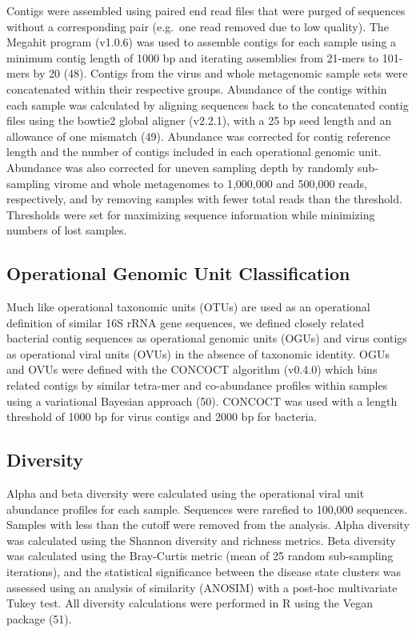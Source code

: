 \documentclass[12pt,]{article}
\begin{document}
Contigs were assembled using paired end read files that were purged of
sequences without a corresponding pair (e.g.~one read removed due to low
quality). The Megahit program (v1.0.6) was used to assemble contigs for
each sample using a minimum contig length of 1000 bp and iterating
assemblies from 21-mers to 101-mers by 20 (48). Contigs from the virus
and whole metagenomic sample sets were concatenated within their
respective groups. Abundance of the contigs within each sample was
calculated by aligning sequences back to the concatenated contig files
using the bowtie2 global aligner (v2.2.1), with a 25 bp seed length and
an allowance of one mismatch (49). Abundance was corrected for contig
reference length and the number of contigs included in each operational
genomic unit. Abundance was also corrected for uneven sampling depth by
randomly sub-sampling virome and whole metagenomes to 1,000,000 and
500,000 reads, respectively, and by removing samples with fewer total
reads than the threshold. Thresholds were set for maximizing sequence
information while minimizing numbers of lost samples.

\subsection{Operational Genomic Unit
Classification}\label{operational-genomic-unit-classification}

Much like operational taxonomic units (OTUs) are used as an operational
definition of similar 16S rRNA gene sequences, we defined closely
related bacterial contig sequences as operational genomic units (OGUs)
and virus contigs as operational viral units (OVUs) in the absence of
taxonomic identity. OGUs and OVUs were defined with the CONCOCT
algorithm (v0.4.0) which bins related contigs by similar tetra-mer and
co-abundance profiles within samples using a variational Bayesian
approach (50). CONCOCT was used with a length threshold of 1000 bp for
virus contigs and 2000 bp for bacteria.

\subsection{Diversity}\label{diversity}

Alpha and beta diversity were calculated using the operational viral
unit abundance profiles for each sample. Sequences were rarefied to
100,000 sequences. Samples with less than the cutoff were removed from
the analysis. Alpha diversity was calculated using the Shannon diversity
and richness metrics. Beta diversity was calculated using the
Bray-Curtis metric (mean of 25 random sub-sampling iterations), and the
statistical significance between the disease state clusters was assessed
using an analysis of similarity (ANOSIM) with a post-hoc multivariate
Tukey test. All diversity calculations were performed in R using the
Vegan package (51).
\end{document}
